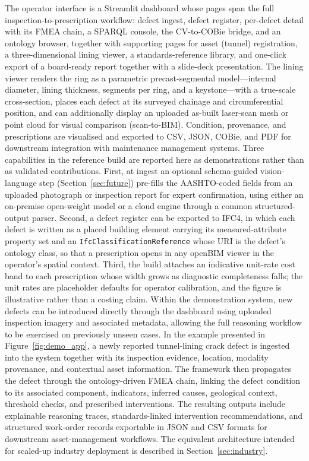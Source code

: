 \documentclass[11pt,a4paper]{article}
\begin{document}
The operator interface is a Streamlit dashboard whose pages span the full inspection-to-prescription workflow: defect ingest, defect register, per-defect detail with its FMEA chain, a SPARQL console, the CV-to-COBie bridge, and an ontology browser, together with supporting pages for asset (tunnel) registration, a three-dimensional lining viewer, a standards-reference library, and one-click export of a board-ready report together with a slide-deck presentation. The lining viewer renders the ring as a parametric precast-segmental model---internal diameter, lining thickness, segments per ring, and a keystone---with a true-scale cross-section, places each defect at its surveyed chainage and circumferential position, and can additionally display an uploaded as-built laser-scan mesh or point cloud for visual comparison (scan-to-BIM). Condition, provenance, and prescriptions are visualised and exported to CSV, JSON, COBie, and PDF for downstream integration with maintenance management systems. Three capabilities in the reference build are reported here as demonstrations rather than as validated contributions. First, at ingest an optional schema-guided vision-language step (Section~\ref{sec:future}) pre-fills the AASHTO-coded fields from an uploaded photograph or inspection report for expert confirmation, using either an on-premise open-weight model or a cloud engine through a common structured-output parser. Second, a defect register can be exported to IFC4, in which each defect is written as a placed building element carrying its measured-attribute property set and an \texttt{IfcClassificationReference} whose URI is the defect's ontology class, so that a prescription opens in any openBIM viewer in the operator's spatial context. Third, the build attaches an indicative unit-rate cost band to each prescription whose width grows as diagnostic completeness falls; the unit rates are placeholder defaults for operator calibration, and the figure is illustrative rather than a costing claim. Within the demonstration system, new defects can be introduced directly through the dashboard using uploaded inspection imagery and associated metadata, allowing the full reasoning workflow to be exercised on previously unseen cases. In the example presented in Figure~\ref{fig:demo_app}, a newly reported tunnel-lining crack defect is ingested into the system together with its inspection evidence, location, modality provenance, and contextual asset information. The framework then propagates the defect through the ontology-driven FMEA chain, linking the defect condition to its associated component, indicators, inferred causes, geological context, threshold checks, and prescribed interventions. The resulting outputs include explainable reasoning traces, standards-linked intervention recommendations, and structured work-order records exportable in JSON and CSV formats for downstream asset-management workflows. The equivalent architecture intended for scaled-up industry deployment is described in Section~\ref{sec:industry}.
\end{document}
